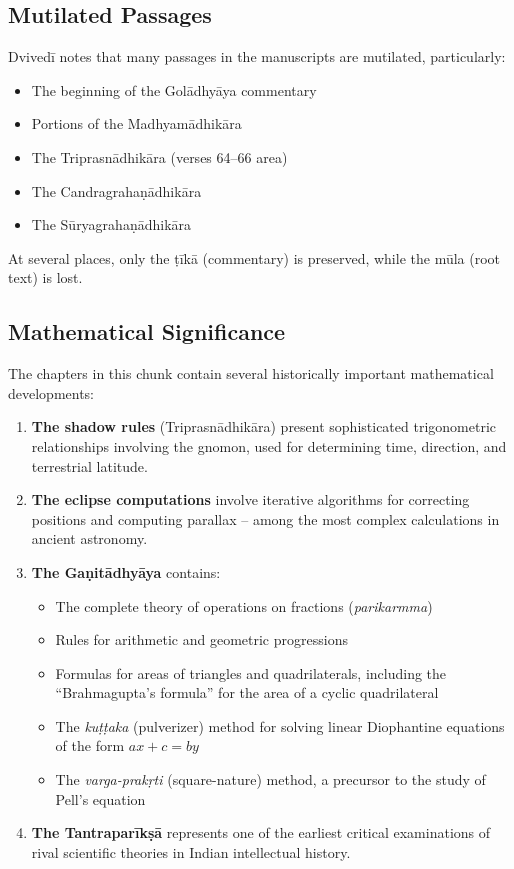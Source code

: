 \documentclass[11pt,a4paper]{article}
\begin{document}
\subsection*{Mutilated Passages}

Dvivedī notes that many passages in the manuscripts are mutilated, particularly:
\begin{itemize}[label=\textbullet]
  \item The beginning of the Golādhyāya commentary
  \item Portions of the Madhyamādhikāra
  \item The Triprasnādhikāra (verses 64--66 area)
  \item The Candragrahaṇādhikāra
  \item The Sūryagrahaṇādhikāra
\end{itemize}

At several places, only the ṭīkā (commentary) is preserved, while the mūla 
(root text) is lost.

\subsection*{Mathematical Significance}

The chapters in this chunk contain several historically important mathematical 
developments:

\begin{enumerate}[label=\arabic*.]
  \item \textbf{The shadow rules} (Triprasnādhikāra) present sophisticated 
  trigonometric relationships involving the gnomon, used for determining time, 
  direction, and terrestrial latitude.
  
  \item \textbf{The eclipse computations} involve iterative algorithms for 
  correcting positions and computing parallax -- among the most complex 
  calculations in ancient astronomy.
  
  \item \textbf{The Gaṇitādhyāya} contains:
  \begin{itemize}
    \item The complete theory of operations on fractions (\textit{parikarmma})
    \item Rules for arithmetic and geometric progressions
    \item Formulas for areas of triangles and quadrilaterals, including the 
    ``Brahmagupta's formula'' for the area of a cyclic quadrilateral
    \item The \textit{kuṭṭaka} (pulverizer) method for solving linear Diophantine 
    equations of the form $ax + c = by$
    \item The \textit{varga-prakṛti} (square-nature) method, a precursor to the 
    study of Pell's equation
  \end{itemize}
  
  \item \textbf{The Tantraparīkṣā} represents one of the earliest critical 
  examinations of rival scientific theories in Indian intellectual history.
\end{enumerate}
\end{document}
